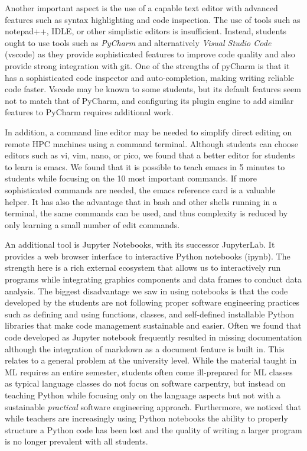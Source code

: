 \documentclass[utf8]{FrontiersinVancouver} %
\begin{document}
Another important aspect is the use of a capable text editor with advanced features  such as 
syntax highlighting and code inspection. The use of
tools such as notepad++, IDLE, or other simplistic editors is
insufficient. Instead, students ought to use tools such as {\em
  PyCharm} and alternatively {\em Visual Studio Code} (vscode) as they provide
sophisticated features to improve code quality and also provide strong
integration with git. One of the strengths of pyCharm is that it has a
sophisticated code inspector and auto-completion, making writing
reliable code faster. Vscode may be known to some students, but its
default features seem not to match that of PyCharm, and configuring its
plugin engine to add similar features to PyCharm requires additional work.

In addition, a
command line editor may be needed to simplify direct editing on remote
HPC machines using a command terminal. Although students can choose
editors such as vi, vim, nano, or pico, we found that a better editor
for students to learn is emacs. We found that it is possible to teach
emacs in 5 minutes to students while focusing on the 10 most important
commands. If more sophisticated commands are needed, the emacs
reference card is a valuable helper. It has also the advantage that in
bash and other shells running in a terminal, the same commands can be
used, and thus complexity is reduced by only learning a small number
of edit commands.

An additional tool is Jupyter Notebooks, with its successor JupyterLab. It
provides a web browser interface to interactive Python notebooks
(ipynb). The strength here is a rich external ecosystem that allows us
to interactively run programs while integrating graphics components
and data frames to conduct data analysis.  The biggest disadvantage we
saw in using notebooks is that the code developed by the students are
not following proper software engineering practices such as defining
and using functions, classes, and self-defined installable Python
libraries that make code management sustainable and easier. Often we
found that code developed as Jupyter notebook frequently
resulted in missing documentation although the integration of markdown as a document
feature is built in. This relates to a general problem at the university
level. While the material taught in ML requires an entire semester,
students often come ill-prepared for ML classes as typical language
classes do not focus on software carpentry, but instead on teaching
Python while focusing only on the language aspects but not with a
sustainable {\em practical} software engineering
approach. Furthermore, we noticed that while teachers are increasingly
using Python notebooks the ability to properly structure a Python code
has been lost and the quality of writing a larger program is no longer
prevalent with all students.
\end{document}
